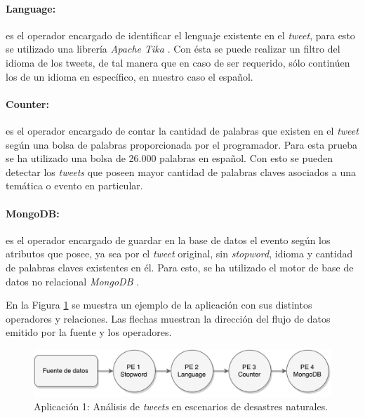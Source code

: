 \paragraph{Language:} es el operador encargado de identificar el lenguaje existente en el \textit{tweet}, para esto se utilizado una librería \textit{Apache Tika} \citep{mattmann2011tika}. Con ésta se puede realizar un filtro del idioma de los tweets, de tal manera que en caso de ser requerido, sólo continúen los de un idioma en específico, en nuestro caso el español.

\paragraph{Counter:} es el operador encargado de contar la cantidad de palabras que existen en el \textit{tweet} según una bolsa de palabras proporcionada por el programador. Para esta prueba se ha utilizado una bolsa de 26.000 palabras en español. Con esto se pueden detectar los \textit{tweets} que poseen mayor cantidad de palabras claves asociados a una temática o evento en particular.

\paragraph{MongoDB:} es el operador encargado de guardar en la base de datos el evento según los atributos que posee, ya sea por el \textit{tweet} original, sin \textit{stopword}, idioma y cantidad de palabras claves existentes en él. Para esto, se ha utilizado el motor de base de datos no relacional \textit{MongoDB} \citep{chodorow2013mongodb}.

En la Figura \ref{fig:primeraAplicacion} se muestra un ejemplo de la aplicación con sus distintos operadores y relaciones. Las flechas muestran la dirección del flujo de datos emitido por la fuente y los operadores.

\begin{figure}[!hb]
	\centering
		\includegraphics[scale=0.6]{images/App1.pdf}
	\caption{Aplicación 1: Análisis de \textit{tweets} en escenarios de desastres naturales.}
	\label{fig:primeraAplicacion}
\end{figure}

